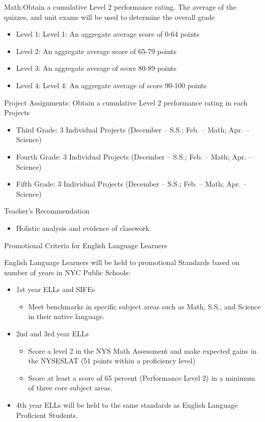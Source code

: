 \documentclass[12pt,letterpaper]{article}
\begin{document}
Math:Obtain a cumulative Level 2 performance rating. The average of the quizzes, and unit exams will be used to determine the overall grade
\begin{itemize}
\item Level 1: Level 1: An aggregate average score of 0-64 points
\item Level 2: An aggregate average score of 65-79 points
\item Level 3: An aggregate average of score 80-89 points
\item Level 4: Level 4: An aggregate average of score 90-100 points
\end{itemize}

Project Assignments: Obtain a cumulative Level 2 performance rating in each Projects
\begin{itemize}
\item Third Grade: 3 Individual Projects (December – S.S.; Feb. – Math; Apr. – Science)
\item Fourth Grade: 3 Individual Projects (December – S.S.; Feb. – Math; Apr. – Science)
\item Fifth Grade: 3 Individual Projects (December – S.S.; Feb. – Math; Apr. – Science)
\end{itemize}

Teacher's Recommendation
\begin{itemize}
\item Holistic analysis and evidence of classwork.
\end{itemize}

Promotional Criteria for English Language Learners

English Language Learners will be held to promotional Standards based on number of years in NYC Public
Schools:
\begin{itemize}
\item 1st year ELLs and SIFEs
	\begin{itemize}
	\item Meet benchmarks in specific subject areas such as Math, S.S., and Science in their native language.
	\end{itemize}
\item 2nd and 3rd year ELLs
\pagebreak
\vspace*{1.5cm}
	\begin{itemize}
	\item Score a level 2 in the NYS Math Assessment and make expected gains in the NYSESLAT (51 points within a proficiency level)
	\item Score at least a score of 65 percent (Performance Level 2) in a minimum of three core subject areas.
	\end{itemize}
\item 4th year ELLs will be held to the same standards as English Language Proficient Students.
\end{itemize}
\end{document}
